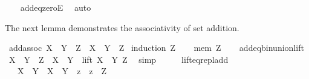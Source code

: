 \begin{isabellebody}
%
\isadelimproof
\ \ %
\endisadelimproof
%
\isatagproof
{}\isamarkupfalse%
\ add{\isacharunderscore}{\kern0pt}eq{\isacharunderscore}{\kern0pt}zeroE\ \isamarkupfalse%
\ auto%
\endisatagproof
{\isafoldproof}%
%
\isadelimproof
%
\endisadelimproof
%
\begin{isamarkuptext}%
The next lemma demonstrates the associativity of set addition.%
\end{isamarkuptext}\isamarkuptrue%
\isamarkupfalse%
\ add{\isacharunderscore}{\kern0pt}assoc{\isacharcolon}{\kern0pt}\ {\isachardoublequoteopen}{\isacharparenleft}{\kern0pt}X\ {\isacharplus}{\kern0pt}\ Y{\isacharparenright}{\kern0pt}\ {\isacharplus}{\kern0pt}\ Z\ {\isacharequal}{\kern0pt}\ X\ {\isacharplus}{\kern0pt}\ {\isacharparenleft}{\kern0pt}Y\ {\isacharplus}{\kern0pt}\ Z{\isacharparenright}{\kern0pt}{\isachardoublequoteclose}\isanewline
%
\isadelimproof
%
\endisadelimproof
%
\isatagproof
{}\isamarkupfalse%
\ {\isacharparenleft}{\kern0pt}induction\ Z{\isacharparenright}{\kern0pt}\isanewline
\ \ \isamarkupfalse%
\ {\isacharparenleft}{\kern0pt}mem\ Z{\isacharparenright}{\kern0pt}\isanewline
\ \ \isamarkupfalse%
\ add{\isacharunderscore}{\kern0pt}eq{\isacharunderscore}{\kern0pt}bin{\isacharunderscore}{\kern0pt}union{\isacharunderscore}{\kern0pt}lift\ \isamarkupfalse%
\ {\isachardoublequoteopen}{\isacharparenleft}{\kern0pt}X\ {\isacharplus}{\kern0pt}\ Y{\isacharparenright}{\kern0pt}\ {\isacharplus}{\kern0pt}\ Z\ {\isacharequal}{\kern0pt}\ {\isacharparenleft}{\kern0pt}X\ {\isacharplus}{\kern0pt}\ Y{\isacharparenright}{\kern0pt}\ {\isasymunion}\ {\isacharparenleft}{\kern0pt}lift\ {\isacharparenleft}{\kern0pt}X\ {\isacharplus}{\kern0pt}\ Y{\isacharparenright}{\kern0pt}\ Z{\isacharparenright}{\kern0pt}{\isachardoublequoteclose}\ \isamarkupfalse%
\ simp\isanewline
\ \ \isamarkupfalse%
\ \isamarkupfalse%
\ lift{\isacharunderscore}{\kern0pt}eq{\isacharunderscore}{\kern0pt}repl{\isacharunderscore}{\kern0pt}add\ \isamarkupfalse%
\ {\isachardoublequoteopen}{\isachardot}{\kern0pt}{\isachardot}{\kern0pt}{\isachardot}{\kern0pt}\ {\isacharequal}{\kern0pt}\ {\isacharparenleft}{\kern0pt}X\ {\isacharplus}{\kern0pt}\ Y{\isacharparenright}{\kern0pt}\ {\isasymunion}\ {\isacharbraceleft}{\kern0pt}{\isacharparenleft}{\kern0pt}X\ {\isacharplus}{\kern0pt}\ Y{\isacharparenright}{\kern0pt}\ {\isacharplus}{\kern0pt}\ z\ {\isacharbar}{\kern0pt}\ z\ {\isasymin}\ Z{\isacharbraceright}{\kern0pt}{\isachardoublequoteclose}\ \isamarkupfalse%

\end{isabellebody}
